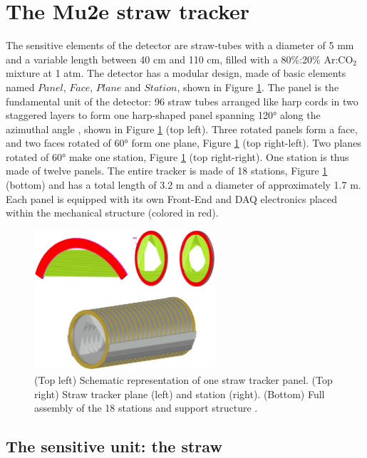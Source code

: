 \section{The Mu2e straw tracker}\label{geomtra}
The sensitive elements of the detector are straw-tubes with a diameter of 5 mm and a variable length between 40 cm and 110 cm, 
filled with a 80\%:20\% Ar:CO$_2$ mixture at 1 atm.  
The detector has a modular design, made of basic elements named $Panel$, $Face$, 
$Plane$ and $Station$, shown in Figure \ref{fig:trkpanel}. 
The panel is the fundamental unit of the detector: 96 straw tubes arranged like 
harp cords in two staggered layers to form one harp-shaped panel spanning 120° along the azimuthal angle \cite{bartoszek2015mu2e}, 
shown in Figure \ref{fig:trkpanel} (top left).
Three rotated panels form a face, and two faces rotated of 60° form one plane, Figure \ref{fig:trkpanel} (top right-left). 
Two planes rotated of 60° make one station, Figure \ref{fig:trkpanel} (top right-right).
One station is thus made of twelve panels. The entire tracker is made of 18 stations, Figure \ref{fig:trkpanel} (bottom) 
and has a total length of 3.2 m and a diameter of approximately 1.7 m.
Each panel is equipped with its own Front-End and DAQ electronics placed within the mechanical structure (colored in red).
\begin{figure}[!h]
\centering
\includegraphics[width =0.6\textwidth]{figures/png/Screenshot_20240306_222803.png}
\caption[The straw tracker components.]{(Top left) Schematic representation of one straw tracker panel. (Top right) 
Straw tracker plane (left) and station (right). (Bottom) Full assembly of the 18 
stations and support structure \cite{bartoszek2015mu2e}.}
\label{fig:trkpanel}
\end{figure}
\subsection{The sensitive unit: the straw}

